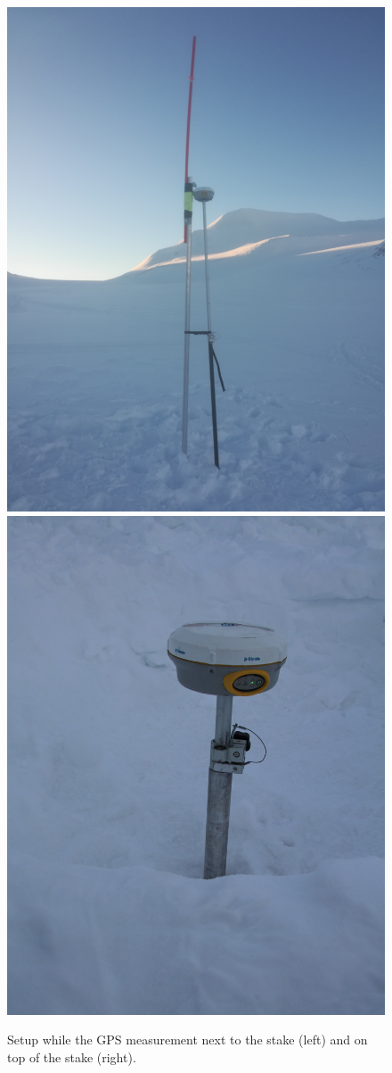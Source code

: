 \begin{figure}[H]
	\centering
	\includegraphics[width=0.48\linewidth]{./figs/pictures/GPS_setup.jpg}
	\includegraphics[width=0.485\linewidth]{./figs/pictures/setup_ontop.JPG}
	\caption{Setup while the GPS measurement next to the stake (left) and on top of the stake (right).}
	\label{GPS:fig:setup}
\end{figure}
